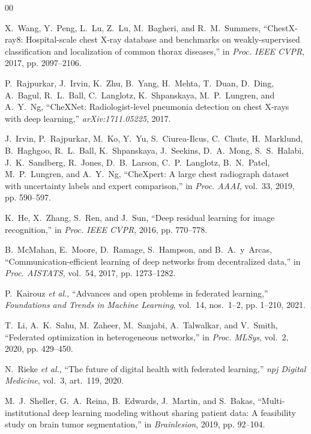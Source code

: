 \documentclass[journal]{IEEEtran}
\begin{document}
\begin{thebibliography}{00}

X.~Wang, Y.~Peng, L.~Lu, Z.~Lu, M.~Bagheri, and R.~M.~Summers, ``ChestX-ray8: Hospital-scale chest X-ray database and benchmarks on weakly-supervised classification and localization of common thorax diseases,'' in \textit{Proc. IEEE CVPR}, 2017, pp. 2097--2106.

P.~Rajpurkar, J.~Irvin, K.~Zhu, B.~Yang, H.~Mehta, T.~Duan, D.~Ding, A.~Bagul, R.~L.~Ball, C.~Langlotz, K.~Shpanskaya, M.~P.~Lungren, and A.~Y.~Ng, ``CheXNet: Radiologist-level pneumonia detection on chest X-rays with deep learning,'' \textit{arXiv:1711.05225}, 2017.

J.~Irvin, P.~Rajpurkar, M.~Ko, Y.~Yu, S.~Ciurea-Ilcus, C.~Chute, H.~Marklund, B.~Haghgoo, R.~L.~Ball, K.~Shpanskaya, J.~Seekins, D.~A.~Mong, S.~S.~Halabi, J.~K.~Sandberg, R.~Jones, D.~B.~Larson, C.~P.~Langlotz, B.~N.~Patel, M.~P.~Lungren, and A.~Y.~Ng, ``CheXpert: A large chest radiograph dataset with uncertainty labels and expert comparison,'' in \textit{Proc. AAAI}, vol.~33, 2019, pp. 590--597.

K.~He, X.~Zhang, S.~Ren, and J.~Sun, ``Deep residual learning for image recognition,'' in \textit{Proc. IEEE CVPR}, 2016, pp. 770--778.

B.~McMahan, E.~Moore, D.~Ramage, S.~Hampson, and B.~A.~y~Arcas, ``Communication-efficient learning of deep networks from decentralized data,'' in \textit{Proc. AISTATS}, vol.~54, 2017, pp. 1273--1282.

P.~Kairouz \textit{et al.}, ``Advances and open problems in federated learning,'' \textit{Foundations and Trends in Machine Learning}, vol.~14, nos.~1--2, pp. 1--210, 2021.

T.~Li, A.~K.~Sahu, M.~Zaheer, M.~Sanjabi, A.~Talwalkar, and V.~Smith, ``Federated optimization in heterogeneous networks,'' in \textit{Proc. MLSys}, vol.~2, 2020, pp. 429--450.

N.~Rieke \textit{et al.}, ``The future of digital health with federated learning,'' \textit{npj Digital Medicine}, vol.~3, art.~119, 2020.

M.~J.~Sheller, G.~A.~Reina, B.~Edwards, J.~Martin, and S.~Bakas, ``Multi-institutional deep learning modeling without sharing patient data: A feasibility study on brain tumor segmentation,'' in \textit{Brainlesion}, 2019, pp. 92--104.


\end{thebibliography}
\end{document}
